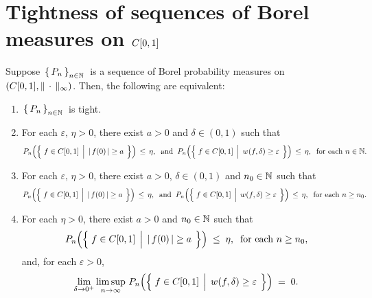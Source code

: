 

\section{Tightness of sequences of Borel measures on $C[0,1]$}
\setcounter{theorem}{0}
\setcounter{equation}{0}

\renewcommand{\theenumi}{\roman{enumi}}
\renewcommand{\labelenumi}{\textnormal{(\theenumi)}$\;\;$}

\begin{theorem}
\label{NecessarySufficientTightnessCzo}
\mbox{}\vskip 0.1cm
\noindent
Suppose \,$\left\{\,P_{n}\,\right\}_{n\in\mathbb{N}}$\, is a sequence of Borel probability measures on
$\left(C[0,1],\Vert\,\cdot\,\Vert_{\infty}\right)$.
\vskip0.1cm
\noindent
Then, the following are equivalent:
\begin{enumerate}
\item	\,$\left\{\,P_{n}\,\right\}_{n\in\mathbb{N}}$\, is tight.
\item	For each $\varepsilon,\,\eta > 0$, there exist $a > 0$ and $\delta \in (0,1)$ such that
		\begin{equation*}
		P_{n}\!\left(\left\{\;
			f \in \Czo
			\;\left\vert\;\,
			\vert\,f(0)\,\vert \overset{{\color{white}.}}{\geq} a
			\right.
		\;\right\}\right)
		\,\leq\, \eta,
		\;\;\textnormal{and}\;\;
		P_{n}\!\left(\left\{\;
			f \in \Czo
			\;\left\vert\;\,
			w(f,\delta) \overset{{\color{white}.}}{\geq} \varepsilon
			\right.
		\;\right\}\right)
		\,\leq\, \eta,
		\;\;
		\textnormal{for each $n \in \N$}.
		\end{equation*}
\item	For each $\varepsilon,\,\eta > 0$, there exist $a > 0$, $\delta \in (0,1)$ and $n_{0} \in \mathbb{N}$ such that
		\begin{equation*}
		P_{n}\!\left(\left\{\;
			f \in \Czo
			\;\left\vert\;\,
			\vert\,f(0)\,\vert \overset{{\color{white}.}}{\geq} a
			\right.
		\;\right\}\right)
		\,\leq\, \eta,
		\;\;\textnormal{and}\;\;
		P_{n}\!\left(\left\{\;
			f \in \Czo
			\;\left\vert\;\,
			w(f,\delta) \overset{{\color{white}.}}{\geq} \varepsilon
			\right.
		\;\right\}\right)
		\,\leq\, \eta,
		\;\;
		\textnormal{for each $n \geq n_{0}$}.
		\end{equation*}
\item	For each $\eta > 0$, there exist $a > 0$ and $n_{0} \in \mathbb{N}$ such that
		\begin{equation*}
		P_{n}\!\left(\left\{\;
			f \in \Czo
			\;\left\vert\;\,
			\vert\,f(0)\,\vert \overset{{\color{white}.}}{\geq} a
			\right.
		\;\right\}\right)
		\;\leq\; \eta,
		\;\;\textnormal{for each $n \geq n_{0}$},
		\end{equation*}
		and, for each $\varepsilon > 0$,
		\begin{equation*}
		\lim_{\delta\rightarrow 0^{+}}
		\limsup_{n\rightarrow\infty}\,
		P_{n}\!\left(\left\{\;
			f \in \Czo
			\;\left\vert\;\,
			w(f,\delta) \overset{{\color{white}.}}{\geq} \varepsilon
			\right.
		\;\right\}\right)
		\;=\; 0.		
		\end{equation*}
\end{enumerate}
\end{theorem}
